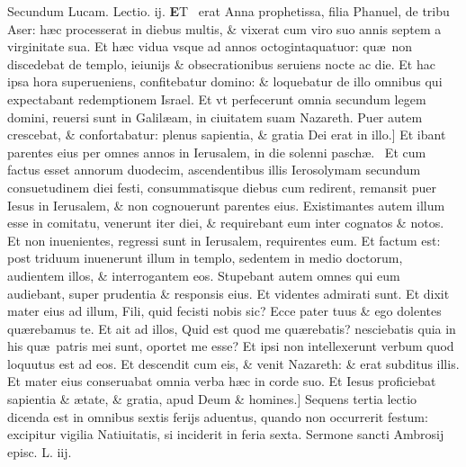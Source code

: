 \documentclass[a5paper,10pt]{book}
\def\leftmarginnote{%
	\lrmarginnote{\hskip -\marginparsep \hskip -6.5em}}
\def\ae{æ}
\begin{document}
\begin{multicols*}{2}
\newline \color{red} Secundum Lucam. \hfill Lectio. ij. \color{black}
\vspace{-.25em}
\lettrine[lines=2]{\bfseries \color{red} E}{}T \textdagger \ erat\leftmarginnote{\begin{flushright}c.2.f\end{flushright}} Anna prophetissa, filia Phanuel, de tribu Aser: h\ae c processerat in diebus multis, \& vixerat cum viro suo annis septem a virginitate sua.
Et h\ae c vidua vsque ad annos octogintaquatuor: qu\ae \ non discedebat de templo, ieiunijs \& obsecrationibus seruiens nocte ac die.
Et hac ipsa hora superueniens, confitebatur domino: \& loquebatur de illo omnibus qui expectabant redemptionem Israel.
Et vt perfecerunt omnia secundum legem domini, reuersi sunt in Galil\ae am, in ciuitatem suam Nazareth.
Puer autem crescebat, \& confortabatur: plenus sapientia, \& gratia Dei erat in illo.]
Et\leftmarginnote{\begin{flushright}G\end{flushright}} ibant parentes eius per omnes annos in Ierusalem, in die solenni pasch\ae . \textdagger \ 
Et cum factus esset annorum duodecim, ascendentibus illis Ierosolymam secundum consuetudinem diei festi, consummatisque diebus cum redirent, remansit puer Iesus in Ierusalem, \& non cognouerunt parentes eius.
Existimantes autem illum esse in comitatu, venerunt iter diei, \& requirebant eum inter cognatos \& notos.
Et non inuenientes, regressi sunt in Ierusalem, requirentes eum. Et factum est: post triduum inuenerunt illum in templo, sedentem in medio doctorum, audientem illos, \& interrogantem eos.
Stupebant autem omnes qui eum audiebant, super prudentia \& responsis eius.
Et videntes admirati sunt. Et dixit mater eius ad illum, Fili, quid fecisti nobis sic?
Ecce pater tuus \& ego dolentes qu\ae rebamus te.
Et ait ad illos, Quid est quod me qu\ae rebatis? nesciebatis quia in his qu\ae \ patris mei sunt, oportet me esse?
Et ipsi non intellexerunt verbum quod loquutus est ad eos. Et descendit cum eis, \& venit Nazareth: \& erat subditus illis.
Et mater eius conseruabat omnia verba h\ae c in corde suo. Et Iesus proficiebat sapientia \& \ae tate, \& gratia, apud Deum \& homines.]
\newline \textswab{C} \color{red} Sequens tertia lectio dicenda est in omnibus sextis ferijs aduentus, quando non occurrerit festum: excipitur vigilia Natiuitatis, si inciderit in feria sexta. \color{black}
\newline \color{red} Sermone sancti Ambrosij episc. L. iij. \color{black}

\end{multicols*}
\end{document}
